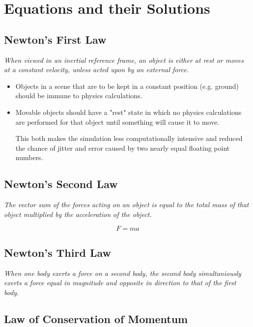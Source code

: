 \documentclass[a4paper]{article}
\begin{document}
\tableofcontents

\section{Equations and their Solutions}
\label{sec:equations_and_their_solutions}

\subsection{Newton's First Law}

\textit{When viewed in an inertial reference frame, an object is either at rest
or moves at a constant velocity, unless acted upon by an external force.}

\begin{itemize}
  \item
    Objects in a scene that are to be kept in a constant position (e.g. ground)
    should be immune to physics calculations.

  \item
    Movable objects should have a "rest" state in which no physics calculations
    are performed for that object until something will cause it to move.

    This both makes the simulation less computationally intensive and reduced
    the chance of jitter and error caused by two nearly equal floating point
    numbers.
\end{itemize}

\subsection{Newton's Second Law}

\textit{The vector sum of the forces acting on an object is equal to the total
mass of that object multiplied by the acceleration of the object.}

\[
  F = ma
\]

\subsection{Newton's Third Law}

\textit{When one body exerts a force on a second body, the second body
simultaniously exerts a force equal in magnitude and opposite in direction to
that of the first body.}

\subsection{Law of Conservation of Momentum}
\end{document}
